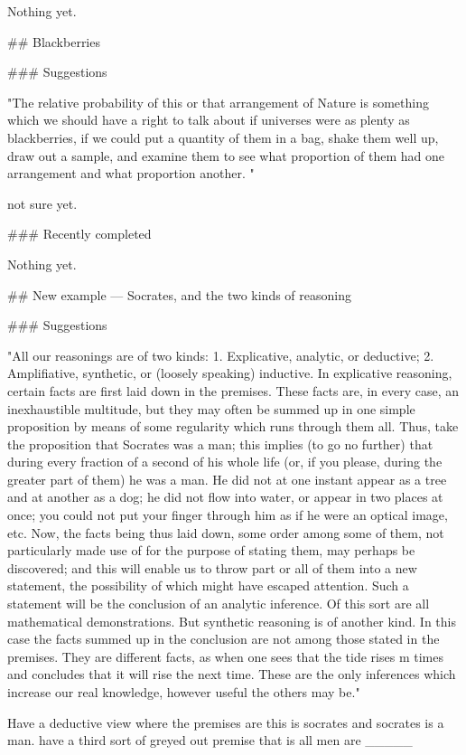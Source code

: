 Nothing yet.


## Blackberries

### Suggestions

"The relative probability of this or that arrangement of Nature is something which we should have a right to talk about if universes were as plenty as blackberries, if we could put a quantity of them in a bag, shake them well up, draw out a sample, and examine them to see what proportion of them had one arrangement and what proportion another. "

not sure yet.

### Recently completed

Nothing yet.


## New example — Socrates, and the two kinds of reasoning

### Suggestions

"All our reasonings are of two kinds: 1. Explicative, analytic, or deductive; 2. Amplifiative, synthetic, or (loosely speaking) inductive. In explicative reasoning, certain facts are first laid down in the premises. These facts are, in every case, an inexhaustible multitude, but they may often be summed up in one simple proposition by means of some regularity which runs through them all. Thus, take the proposition that Socrates was a man; this implies (to go no further) that during every fraction of a second of his whole life (or, if you please, during the greater part of them) he was a man. He did not at one instant appear as a tree and at another as a dog; he did not flow into water, or appear in two places at once; you could not put your finger through him as if he were an optical image, etc. Now, the facts being thus laid down, some order among some of them, not particularly made use of for the purpose of stating them, may perhaps be discovered; and this will enable us to throw part or all of them into a new statement, the possibility of which might have escaped attention. Such a statement will be the conclusion of an analytic inference. Of this sort are all mathematical demonstrations. But synthetic reasoning is of another kind. In this case the facts summed up in the conclusion are not among those stated in the premises. They are different facts, as when one sees that the tide rises m times and concludes that it will rise the next time. These are the only inferences which increase our real knowledge, however useful the others may be."

Have a deductive view where the premises are this is socrates and socrates is a man. have a third sort of greyed out premise that is all men are _____

